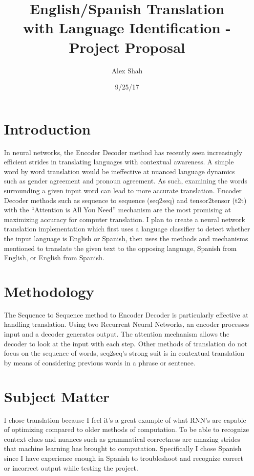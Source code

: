 \documentclass[10pt,a4paper]{report}
\begin{document}
\title{English/Spanish Translation \\ with Language Identification - \\ Project Proposal}
\author{Alex Shah}
\date{9/25/17}

\maketitle

\section{Introduction}
In neural networks, the Encoder Decoder method has recently seen increasingly efficient strides in translating languages with contextual awareness. A simple word by word translation would be ineffective at nuanced language dynamics such as gender agreement and pronoun agreement. As such, examining the words surrounding a given input word can lead to more accurate translation. Encoder Decoder methods such as sequence to sequence (seq2seq) and tensor2tensor (t2t) with the “Attention is All You Need” mechanism are the most promising at maximizing accuracy for computer translation. I plan to create a neural network translation implementation which first uses a language classifier to detect whether the input language is English or Spanish, then uses the methods and mechanisms mentioned to translate the given text to the opposing language, Spanish from English, or English from Spanish.

\section{Methodology}
The Sequence to Sequence method to Encoder Decoder is particularly effective at handling translation. Using two Recurrent Neural Networks, an encoder processes input and a decoder generates output. The attention mechanism allows the decoder to look at the input with each step. Other methods of translation do not focus on the sequence of words, seq2seq’s strong suit is in contextual translation by means of considering previous words in a phrase or sentence.

\section{Subject Matter}
I chose translation because I feel it’s a great example of what RNN’s are capable of optimizing compared to older methods of computation. To be able to recognize context clues and nuances such as grammatical correctness are amazing strides that machine learning has brought to computation. Specifically I chose Spanish since I have experience enough in Spanish to troubleshoot and recognize correct or incorrect output while testing the project.
\end{document}
